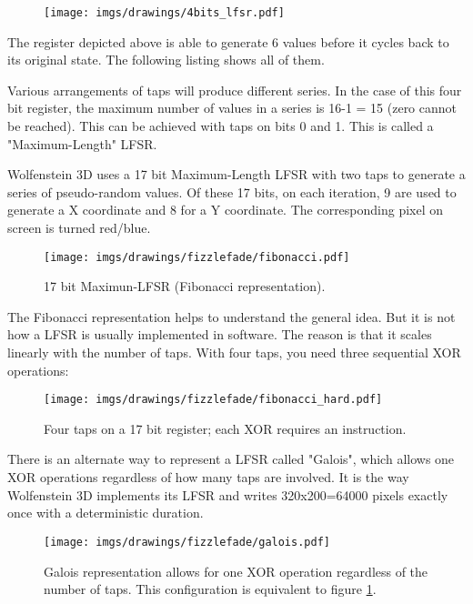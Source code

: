 \begin{figure}[H]
 \centering
  \texttt{[image: imgs/drawings/4bits\_lfsr.pdf]}
\end{figure}
The register depicted above is able to generate 6 values before it cycles back to its original state. The following listing shows all of them.\\
\par
\begin{minipage}{\textwidth}

\end{minipage}
\par
Various arrangements of taps will produce different series. In the case of this four bit register, the maximum number of values in a series is 16-1 = 15 (zero cannot be reached). This can be achieved with taps on bits 0 and 1. This is called a "Maximum-Length" LFSR.\\
\par
\begin{minipage}{\textwidth}

\end{minipage}
\par
\par
Wolfenstein 3D  uses a 17 bit Maximum-Length LFSR with two taps to generate a series of pseudo-random values. Of these 17 bits, on each iteration, 9 are used to generate a X coordinate and 8 for a Y coordinate. The corresponding pixel on screen is turned red/blue.\\
\par
\begin{figure}[H] 
   \centering \texttt{[image: imgs/drawings/fizzlefade/fibonacci.pdf]} 
   \caption{17 bit Maximun-LFSR (Fibonacci representation).}
   \label{wolf_lfsr_fibo}
\end{figure}
\par
The Fibonacci representation helps to understand the general idea. But it is not how a LFSR is usually implemented in software. The reason is that it scales linearly with the number of taps. With four taps, you need three sequential XOR operations:
\par
\begin{figure}[H] 
    \centering \texttt{[image: imgs/drawings/fizzlefade/fibonacci\_hard.pdf]} 
    \caption{Four taps on a 17 bit register; each XOR requires an instruction.}
\end{figure}
\par
There is an alternate way to represent a LFSR called "Galois", which allows one XOR operations regardless of how many taps are involved. It is the way Wolfenstein 3D implements its LFSR and writes 320x200=64000 pixels exactly once with a deterministic duration.
\par
\begin{figure}[H] 
    \centering \texttt{[image: imgs/drawings/fizzlefade/galois.pdf]} 
    \caption{Galois representation allows for one XOR operation regardless of the number of taps. This configuration is equivalent to figure \ref{wolf_lfsr_fibo}.}
\end{figure}
      
